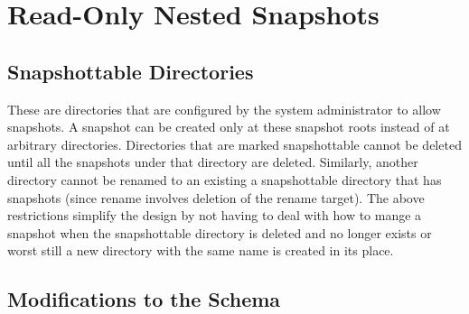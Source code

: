 \section{Read-Only Nested Snapshots}


\subsection{Snapshottable Directories}

 These are directories that are configured
by the system administrator to allow snapshots. A snapshot can be created only at these snapshot roots
instead of at arbitrary directories.
Directories that are marked snapshottable cannot be deleted until all the snapshots under that directory
are deleted. Similarly, another directory cannot be renamed to an existing a snapshottable directory
that has snapshots (since rename involves deletion of the rename target). The above restrictions
simplify the design by not having to deal with how to mange a snapshot when the snapshottable
directory is deleted and no longer exists or worst still a new directory with the same name is created in
its place.

\subsection{Modifications to the Schema}
\label{RONSS:schema}

